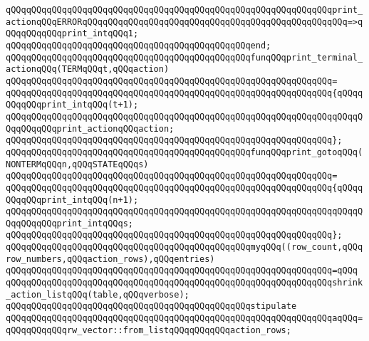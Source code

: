 \verb|qQQqqQQqqQQqqQQqqQQqqQQqqQQqqQQqqQQqqQQqqQQqqQQqqQQqqQQqqQQqqQQqprint_actionqQQqERRORqQQqqQQqqQQqqQQqqQQqqQQqqQQqqQQqqQQqqQQqqQQqqQQqqQQq=>qQQqqQQqqQQqprint_intqQQq1;|\newline
\verb|qQQqqQQqqQQqqQQqqQQqqQQqqQQqqQQqqQQqqQQqqQQqqQQqend;|\newline
\newline
\verb|qQQqqQQqqQQqqQQqqQQqqQQqqQQqqQQqqQQqqQQqqQQqqQQqfunqQQqprint_terminal_actionqQQq(TERMqQQqt,qQQqaction)|\newline
\verb|qQQqqQQqqQQqqQQqqQQqqQQqqQQqqQQqqQQqqQQqqQQqqQQqqQQqqQQqqQQqqQQq=|\newline
\verb|qQQqqQQqqQQqqQQqqQQqqQQqqQQqqQQqqQQqqQQqqQQqqQQqqQQqqQQqqQQqqQQq{qQQqqQQqqQQqprint_intqQQq(t+1);|\newline
\verb|qQQqqQQqqQQqqQQqqQQqqQQqqQQqqQQqqQQqqQQqqQQqqQQqqQQqqQQqqQQqqQQqqQQqqQQqqQQqqQQqprint_actionqQQqaction;|\newline
\verb|qQQqqQQqqQQqqQQqqQQqqQQqqQQqqQQqqQQqqQQqqQQqqQQqqQQqqQQqqQQqqQQq};|\newline
\newline
\verb|qQQqqQQqqQQqqQQqqQQqqQQqqQQqqQQqqQQqqQQqqQQqqQQqfunqQQqprint_gotoqQQq(NONTERMqQQqn,qQQqSTATEqQQqs)|\newline
\verb|qQQqqQQqqQQqqQQqqQQqqQQqqQQqqQQqqQQqqQQqqQQqqQQqqQQqqQQqqQQqqQQq=|\newline
\verb|qQQqqQQqqQQqqQQqqQQqqQQqqQQqqQQqqQQqqQQqqQQqqQQqqQQqqQQqqQQqqQQq{qQQqqQQqqQQqprint_intqQQq(n+1);|\newline
\verb|qQQqqQQqqQQqqQQqqQQqqQQqqQQqqQQqqQQqqQQqqQQqqQQqqQQqqQQqqQQqqQQqqQQqqQQqqQQqqQQqprint_intqQQqs;|\newline
\verb|qQQqqQQqqQQqqQQqqQQqqQQqqQQqqQQqqQQqqQQqqQQqqQQqqQQqqQQqqQQqqQQq};|\newline
\newline
\verb|qQQqqQQqqQQqqQQqqQQqqQQqqQQqqQQqqQQqqQQqqQQqqQQqmyqQQq((row_count,qQQqrow_numbers,qQQqaction_rows),qQQqentries)|\newline
\verb|qQQqqQQqqQQqqQQqqQQqqQQqqQQqqQQqqQQqqQQqqQQqqQQqqQQqqQQqqQQqqQQq=qQQq|\newline
\verb|qQQqqQQqqQQqqQQqqQQqqQQqqQQqqQQqqQQqqQQqqQQqqQQqqQQqqQQqqQQqqQQqshrink_action_listqQQq(table,qQQqverbose);|\newline
\newline
\verb|qQQqqQQqqQQqqQQqqQQqqQQqqQQqqQQqqQQqqQQqqQQqqQQqstipulate|\newline
\verb|qQQqqQQqqQQqqQQqqQQqqQQqqQQqqQQqqQQqqQQqqQQqqQQqqQQqqQQqqQQqqQQqaqQQq=qQQqqQQqqQQqrw_vector::from_listqQQqqQQqqQQqaction_rows;|\newline

